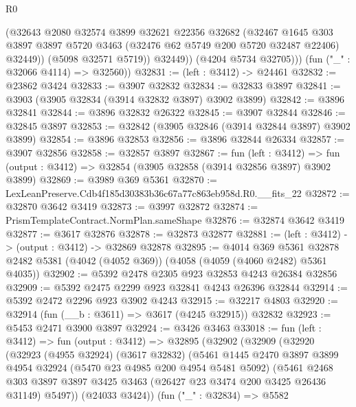 \begin{lexlean}{R0}
\begin{coremodule}
                (@32643
                  @2080
                  @32574
                  @3899
                  @32621
                  @22356
                  @32682
                  (@32467
                    @1645
                    @303
                    @3897
                    @3897
                    @5720
                    @3463
                    (@32476 @62 @5749 @200 @5720 @32487 @22406)
                    @32449))
                (@5098 @32571 @5719))
              @32449))
          (@4204 @5734 @32705)))
      (fun ("_" : @32066 @4114) => @32560))
@32831 := (left : @3412) -> @24461
@32832 := @23862 @3424
@32833 := @3907 @32832
@32834 := @32833 @3897
@32841 := @3903 (@3905 @32834 (@3914 @32832 @3897) @3902 @3899)
@32842 := @3896 @32841
@32844 := @3896 @32832 @26322
@32845 := @3907 @32844
@32846 := @32845 @3897
@32853 := @32842 (@3905 @32846 (@3914 @32844 @3897) @3902 @3899)
@32854 := @3896 @32853
@32856 := @3896 @32844 @26334
@32857 := @3907 @32856
@32858 := @32857 @3897
@32867 := fun (left : @3412) =>
  fun (output : @3412) => @32854 (@3905 @32858 (@3914 @32856 @3897) @3902 @3899)
@32869 := @3989 @369 @5361
@32870 := LexLeanPreserve.Cdb4f185d30383b36c67a77c863eb958d.R0.__fits_22
@32872 := @32870 @3642 @3419
@32873 := @3997 @32872
@32874 := PrismTemplateContract.NormPlan.sameShape
@32876 := @32874 @3642 @3419
@32877 := @3617 @32876
@32878 := @32873 @32877
@32881 := (left : @3412) -> (output : @3412) -> @32869 @32878
@32895 := @4014
    @369
    @5361
    @32878
    @2482
    @5381
    (@4042 (@4052 @369))
    (@4058 (@4059 (@4060 @2482) @5361 @4035))
@32902 := @5392 @2478 @2305 @923 @32853 @4243 @26384 @32856
@32909 := @5392 @2475 @2299 @923 @32841 @4243 @26396 @32844
@32914 := @5392 @2472 @2296 @923 @3902 @4243
@32915 := @32217 @4803
@32920 := @32914 (fun (__b : @3611) => @3617 (@4245 @32915)) @32832
@32923 := @5453 @2471 @3900 @3897
@32924 := @3426 @3463
@33018 := fun (left : @3412) =>
  fun (output : @3412) =>
  @32895
    (@32902
      (@32909
        (@32920
          (@32923
            (@4955 @32924)
            (@3617 @32832)
            (@5461
              @1445
              @2470
              @3897
              @3899
              @4954
              @32924
              (@5470 @23 @4985 @200 @4954 @5481 @5092)
              (@5461
                @2468
                @303
                @3897
                @3897
                @3425
                @3463
                (@26427 @23 @3474 @200 @3425 @26436 @31149)
                @5497))
            (@24033 @3424))
          (fun ("_" : @32834) =>
          @5582

\end{coremodule}
\end{lexlean}
